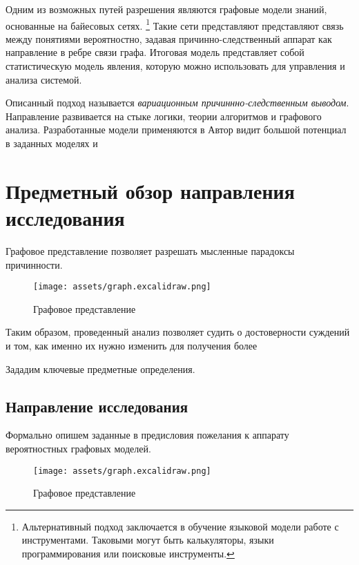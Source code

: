 
Одним из возможных путей разрешения являются графовые модели знаний, основанные 
на байесовых сетях. \footnote{Альтернативный подход заключается в обучение языковой модели работе с инструментами. Таковыми могут быть калькуляторы,
языки программирования или поисковые инструменты.} Такие сети представляют представляют связь между понятиями вероятностно, 
задавая причинно-следственный аппарат как направление в ребре связи графа. 
Итоговая модель представляет собой статистическую модель явления, которую можно использовать для
управления и анализа системой. 

Описанный подход называется \textit{вариационным причиннно-следственным выводом}. Направление развивается на стыке логики,
теории алгоритмов и графового анализа. Разработанные модели применяются в  
Автор видит большой потенциал в заданных моделях и 

\section{Предметный обзор направления исследования}


Графовое представление позволяет разрешать мысленные парадоксы причинности.

\begin{figure}[h]
    \centering
    \texttt{[image: assets/graph.excalidraw.png]}
    \caption{Графовое представление}
    \label{graph}
\end{figure}





Таким образом, проведенный анализ позволяет судить о достоверности суждений и том, как именно их нужно изменить 
для получения более

Зададим ключевые предметные определения.

\subsection{Направление исследования} 


Формально опишем заданные в предисловия пожелания к аппарату вероятностных графовых моделей.


\begin{figure}[h]
    \centering
    \texttt{[image: assets/graph.excalidraw.png]}
    \caption{Графовое представление}
    \label{graph}
\end{figure}

